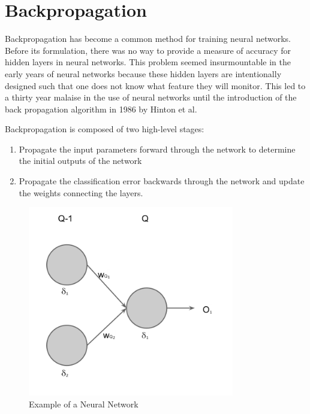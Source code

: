 \documentclass{report}
\begin{document}
\section{Backpropagation}
Backpropagation has become a common method for training neural networks. Before its formulation,  there was no way to provide a measure of accuracy for hidden layers in neural networks. This problem seemed insurmountable in the early years of neural networks because these hidden layers are intentionally designed such that one does not know what feature they will monitor. This led to a thirty year malaise in the use of neural networks until the introduction of the back propagation algorithm in 1986 by Hinton et al. \cite{Orr}

Backpropagation is composed of two high-level stages:

\begin{enumerate}
\item Propagate the input parameters forward through the network to determine the initial outputs of the network
\item Propagate the classification error backwards through the network and update the weights connecting the layers.
\end{enumerate}

\begin{figure}[ht!]
  \label{neuralNet}
  \centering
  \includegraphics[width=90mm]{neuralNet}
  \caption{Example of a Neural Network}
\end{figure}
\end{document}
